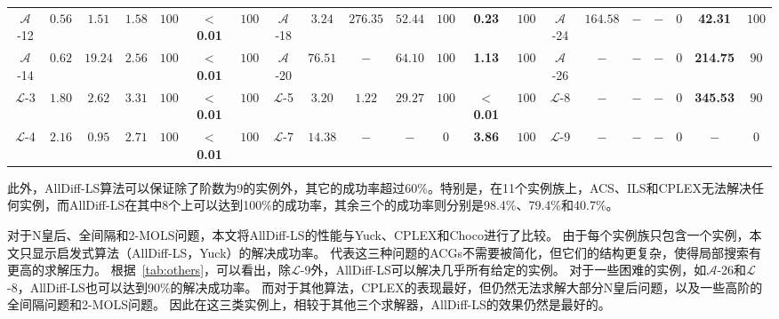 \begin{table}[]
{\begin{tabular}{ccccccc|ccccccc|ccccccc}
            $\mathcal{A}$-12 & $0.56$ & $1.51$ & $1.58$ & $100$ & $\mathbf{<}$\textbf{0.01} & $100$ &
            $\mathcal{A}$-18 & $3.24$ & $276.35$ & $52.44$ & $100$ & \textbf{0.23} & $100$ &
            $\mathcal{A}$-24 & $164.58$ & $-$ & $-$ & $0$ & \textbf{42.31} & $100$ \\

            $\mathcal{A}$-14 & $0.62$ & $19.24$ & $2.56$ & $100$ & $\mathbf{<}$\textbf{0.01} & $100$ &
            $\mathcal{A}$-20 & $76.51$ & $-$ & $64.10$ & $100$ & \textbf{1.13} & $100$ &
            $\mathcal{A}$-26 & $-$ & $-$ & $-$ & $0$ & \textbf{214.75} & $90$ \\

            \hline
            $\mathcal{L}$-3 & $1.80$ & $2.62$ & $3.31$ & $100$ & $\mathbf{<}$\textbf{0.01} & $100$ &
            $\mathcal{L}$-5 & $3.20$ & $1.22$ & $29.27$ & $100$ & $\mathbf{<}$\textbf{0.01} & $100$ &
            $\mathcal{L}$-8 & $-$ & $-$ & $-$ & $0$ & \textbf{345.53} & $90$ \\
            
            $\mathcal{L}$-4 & $2.16$ & $0.95$ & $2.71$ & $100$ & $\mathbf{<}$\textbf{0.01} & $100$ &
            $\mathcal{L}$-7 & $14.38$ & $-$ & $-$ & $0$ & \textbf{3.86} & $100$ &
            $\mathcal{L}$-9 & $-$ & $-$ & $-$ & $0$ & $-$ & $0$ \\

            \hline
        \end{tabular}
    }
\end{table}

\clearpage

此外，AllDiff-LS算法可以保证除了阶数为9的实例外，其它的成功率超过60\%。特别是，在11个实例族上，ACS、ILS和CPLEX无法解决任何实例，而AllDiff-LS在其中8个上可以达到100\%的成功率，其余三个的成功率则分别是98.4\%、79.4\%和40.7\%。

对于N皇后、全间隔和2-MOLS问题，本文将AllDiff-LS的性能与Yuck、CPLEX和Choco进行了比较。
由于每个实例族只包含一个实例，本文只显示启发式算法（AllDiff-LS，Yuck）的解决成功率。
代表这三种问题的ACGs不需要被简化，但它们的结构更复杂，使得局部搜索有更高的求解压力。
根据\tablename~\ref{tab:others}，可以看出，除$\mathcal{L}$-9外，AllDiff-LS可以解决几乎所有给定的实例。
对于一些困难的实例，如$\mathcal{A}$-26和$\mathcal{L}$-8，AllDiff-LS也可以达到90\%的解决成功率。
而对于其他算法，CPLEX的表现最好，但仍然无法求解大部分N皇后问题，以及一些高阶的全间隔问题和2-MOLS问题。
因此在这三类实例上，相较于其他三个求解器，AllDiff-LS的效果仍然是最好的。

